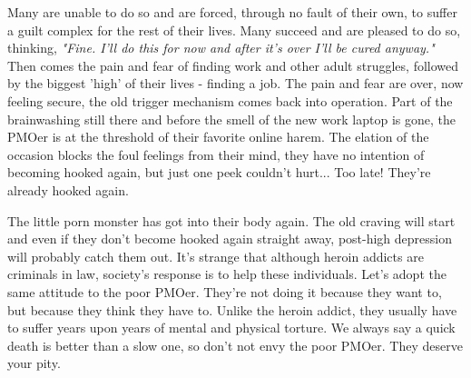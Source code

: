 \documentclass[easypeasy.tex]{subfiles}
\begin{document}
Many are unable to do so and are forced, through no fault of their own, to suffer a guilt complex for the rest of their lives. Many succeed and are pleased to do so, thinking, \textit{"Fine. I'll do this for now and after it's over I'll be cured anyway."} Then comes the pain and fear of finding work and other adult struggles, followed by the biggest 'high' of their lives - finding a job. The pain and fear are over, now feeling secure, the old trigger mechanism comes back into operation. Part of the brainwashing still there and before the smell of the new work laptop is gone, the PMOer is at the threshold of their favorite online harem. The elation of the occasion blocks the foul feelings from their mind, they have no intention of becoming hooked again, but just one peek couldn't hurt... Too late! They're already hooked again.

The little porn monster has got into their body again. The old craving will start and even if they don't become hooked again straight away, post-high depression will probably catch them out. It's strange that although heroin addicts are criminals in law, society's response is to help these individuals. Let's adopt the same attitude to the poor PMOer. They're not doing it because they want to, but because they think they have to. Unlike the heroin addict, they usually have to suffer years upon years of mental and physical torture. We always say a quick death is better than a slow one, so don't not envy the poor PMOer. They deserve your pity.
\end{document}

